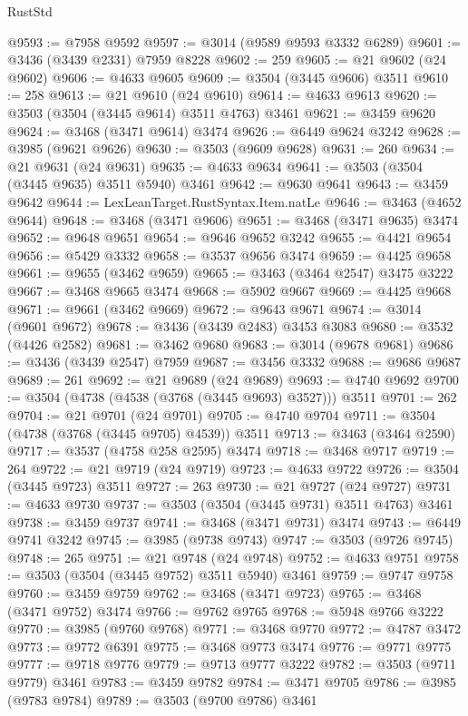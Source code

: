 \begin{lexlean}{RustStd}
\begin{coremodule}
@9593 := @7958 @9592
@9597 := @3014 (@9589 @9593 @3332 @6289)
@9601 := @3436 (@3439 @2331) @7959 @8228
@9602 := 259
@9605 := @21 @9602 (@24 @9602)
@9606 := @4633 @9605
@9609 := @3504 (@3445 @9606) @3511
@9610 := 258
@9613 := @21 @9610 (@24 @9610)
@9614 := @4633 @9613
@9620 := @3503 (@3504 (@3445 @9614) @3511 @4763) @3461
@9621 := @3459 @9620
@9624 := @3468 (@3471 @9614) @3474
@9626 := @6449 @9624 @3242
@9628 := @3985 (@9621 @9626)
@9630 := @3503 (@9609 @9628)
@9631 := 260
@9634 := @21 @9631 (@24 @9631)
@9635 := @4633 @9634
@9641 := @3503 (@3504 (@3445 @9635) @3511 @5940) @3461
@9642 := @9630 @9641
@9643 := @3459 @9642
@9644 := LexLeanTarget.RustSyntax.Item.natLe
@9646 := @3463 (@4652 @9644)
@9648 := @3468 (@3471 @9606)
@9651 := @3468 (@3471 @9635) @3474
@9652 := @9648 @9651
@9654 := @9646 @9652 @3242
@9655 := @4421 @9654
@9656 := @5429 @3332
@9658 := @3537 @9656 @3474
@9659 := @4425 @9658
@9661 := @9655 (@3462 @9659)
@9665 := @3463 (@3464 @2547) @3475 @3222
@9667 := @3468 @9665 @3474
@9668 := @5902 @9667
@9669 := @4425 @9668
@9671 := @9661 (@3462 @9669)
@9672 := @9643 @9671
@9674 := @3014 (@9601 @9672)
@9678 := @3436 (@3439 @2483) @3453 @3083
@9680 := @3532 (@4426 @2582)
@9681 := @3462 @9680
@9683 := @3014 (@9678 @9681)
@9686 := @3436 (@3439 @2547) @7959
@9687 := @3456 @3332
@9688 := @9686 @9687
@9689 := 261
@9692 := @21 @9689 (@24 @9689)
@9693 := @4740 @9692
@9700 := @3504 (@4738 (@4538 (@3768 (@3445 @9693) @3527))) @3511
@9701 := 262
@9704 := @21 @9701 (@24 @9701)
@9705 := @4740 @9704
@9711 := @3504 (@4738 (@3768 (@3445 @9705) @4539)) @3511
@9713 := @3463 (@3464 @2590)
@9717 := @3537 (@4758 @258 @2595) @3474
@9718 := @3468 @9717
@9719 := 264
@9722 := @21 @9719 (@24 @9719)
@9723 := @4633 @9722
@9726 := @3504 (@3445 @9723) @3511
@9727 := 263
@9730 := @21 @9727 (@24 @9727)
@9731 := @4633 @9730
@9737 := @3503 (@3504 (@3445 @9731) @3511 @4763) @3461
@9738 := @3459 @9737
@9741 := @3468 (@3471 @9731) @3474
@9743 := @6449 @9741 @3242
@9745 := @3985 (@9738 @9743)
@9747 := @3503 (@9726 @9745)
@9748 := 265
@9751 := @21 @9748 (@24 @9748)
@9752 := @4633 @9751
@9758 := @3503 (@3504 (@3445 @9752) @3511 @5940) @3461
@9759 := @9747 @9758
@9760 := @3459 @9759
@9762 := @3468 (@3471 @9723)
@9765 := @3468 (@3471 @9752) @3474
@9766 := @9762 @9765
@9768 := @5948 @9766 @3222
@9770 := @3985 (@9760 @9768)
@9771 := @3468 @9770
@9772 := @4787 @3472
@9773 := @9772 @6391
@9775 := @3468 @9773 @3474
@9776 := @9771 @9775
@9777 := @9718 @9776
@9779 := @9713 @9777 @3222
@9782 := @3503 (@9711 @9779) @3461
@9783 := @3459 @9782
@9784 := @3471 @9705
@9786 := @3985 (@9783 @9784)
@9789 := @3503 (@9700 @9786) @3461

\end{coremodule}
\end{lexlean}
